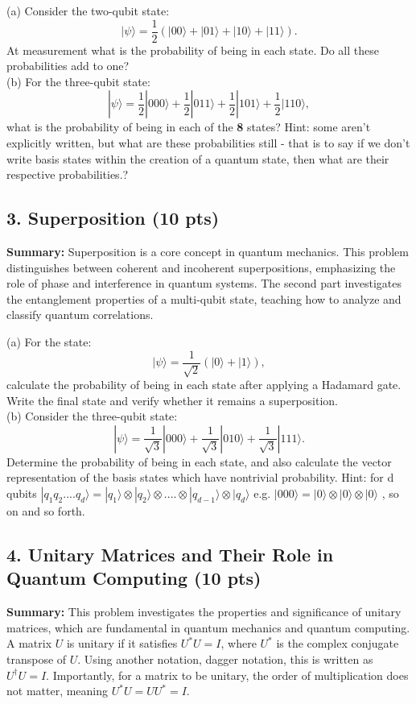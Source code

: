 \documentclass[12pt]{article}
\newcommand{\ket}[1]{| #1 \rangle}
\begin{document}
(a) Consider the two-qubit state:
\[
| \psi \rangle = \frac{1}{2}(|00\rangle + |01\rangle + |10\rangle + |11\rangle).
\]
At measurement what is the probability of being in each state. Do all these probabilities add to one? \\
(b) For the three-qubit state:
\[
| \psi \rangle = \frac{1}{2}|000\rangle + \frac{1}{2}|011\rangle + \frac{1}{2}|101\rangle + \frac{1}{2}|110\rangle,
\]
what is the probability of being in each of the \textbf{8} states? Hint: some aren't explicitly written, but what are these probabilities still - that is to say if we don't write  basis states within the creation of a quantum state, then what are their respective probabilities.?



\subsection*{3. Superposition (10 pts)}

\textbf{Summary:} Superposition is a core concept in quantum mechanics. This problem distinguishes between coherent and incoherent superpositions, emphasizing the role of phase and interference in quantum systems. The second part investigates the entanglement properties of a multi-qubit state, teaching how to analyze and classify quantum correlations.

(a) For the state:
\[
| \psi \rangle = \frac{1}{\sqrt{2}}(|0\rangle + |1\rangle),
\]
calculate the probability of being in each state after applying a Hadamard gate. Write the final state and verify whether it remains a superposition. \\
(b) Consider the three-qubit state:
\[
| \psi \rangle = \frac{1}{\sqrt{3}}|000\rangle + \frac{1}{\sqrt{3}}|010\rangle + \frac{1}{\sqrt{3}}|111\rangle.
\]
Determine the probability of being in each state, and also calculate the vector representation of the basis states which have nontrivial probability. Hint: for d qubits $|q_1 q_2....q_d\rangle = \ket{q_1} \otimes \ket{q_2} \otimes .... \otimes \ket{q_{d-1}} \otimes \ket{q_d}$ e.g. $\ket{000} = \ket{0}\otimes \ket{0} \otimes \ket{0}$
, so on and so forth.


\subsection*{4. Unitary Matrices and Their Role in Quantum Computing (10 pts)}

\textbf{Summary:} This problem investigates the properties and significance of unitary matrices, which are fundamental in quantum mechanics and quantum computing. A matrix \( U \) is unitary if it satisfies \( U^*U = I \), where \( U^* \) is the complex conjugate transpose of \( U \). Using another notation, dagger notation, this is written as \( U^\dagger U = I \). Importantly, for a matrix to be unitary, the order of multiplication does not matter, meaning \( U^*U = UU^* = I \).
\end{document}
